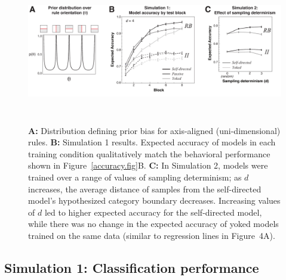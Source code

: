 \documentclass[3p,twocolumn,authoryear,10pt]{elsarticle}
\begin{document}



\begin{figure}[t]
\centerline{\includegraphics[height=2.5in]{figures/simresults_rev.pdf}}
\caption{\textbf{A:} Distribution defining prior bias for axis-aligned (uni-dimensional) rules. \textbf{B:} Simulation 1 results. Expected accuracy of models in each training condition qualitatively match the behavioral performance shown in Figure~\ref{accuracy.fig}B. \textbf{C:} In Simulation 2, models were trained over a range of values of sampling determinism; as $d$ increases, the average distance of samples from the self-directed model's hypothesized category boundary decreases. Increasing values of $d$ led to higher expected accuracy for the self-directed model, while there was no change in the expected accuracy of yoked models trained on the same data (similar to regression lines in Figure~4A).}
\label{simresults.fig}
\end{figure}


\subsection{Simulation 1: Classification performance}
\end{document}
